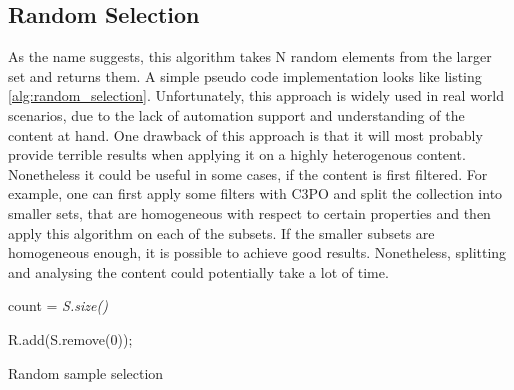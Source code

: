 \subsection{Random Selection}
As the  name suggests, this algorithm takes N random elements from the larger set and returns them. A simple pseudo code implementation looks like listing \ref{alg:random_selection}. Unfortunately, this approach is widely used in real world scenarios, due to the lack of automation support and understanding of the content at hand. One drawback of this approach is that it will most probably provide terrible results when applying it on a highly heterogenous content.
Nonetheless it could be useful in some cases, if the content is first filtered. For example, one can first apply some filters with C3PO and split the collection into smaller sets, that are homogeneous with respect to certain properties and then apply this algorithm on each of the subsets. If the smaller subsets are homogeneous enough, it is possible to achieve good results. Nonetheless, splitting and analysing the content could potentially take a lot of time.

\begin{algorithm}[!htb]

 \BlankLine

count = \textit{S.size()}\; 
 
  {
    {
   	R.add(S.remove(0));
   }
 }
 \caption{Random sample selection}
 \label{alg:random_selection}
\end{algorithm}

